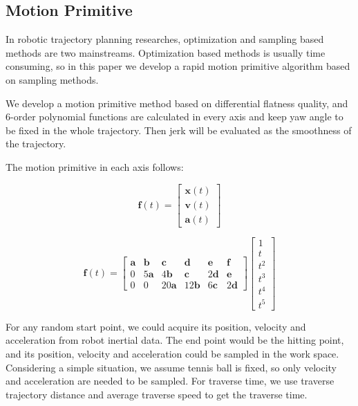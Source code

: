 \documentclass{jarticle}
\begin{document}
\subsection{Motion Primitive}
In robotic trajectory planning researches, optimization and sampling based methods are two mainstreams. Optimization based methods is usually time consuming, so in this paper we develop a rapid motion primitive algorithm based on sampling methods.

We develop a motion primitive method based on differential flatness quality, and 6-order polynomial functions are calculated in every axis and keep yaw angle to be fixed in the whole trajectory. Then jerk will be evaluated as the smoothness of the trajectory\cite{eth-juggling}.

The motion primitive in each axis follows:

\begin{equation}
  \label{eq:temp}
  \bm{f}(t) = \left[ \begin{array}{c}
      \bm{x}(t) \\
      \bm{v}(t) \\
      \bm{a}(t)
    \end{array}\right]
\end{equation}

\begin{equation}
  \label{eq:temp2}
  \bm{f}(t) = \begin{bmatrix}
      \bm{a} & \bm{b} & \bm{c} & \bm{d} & \bm{e} & \bm{f} \\
      0 & 5\bm{a} & 4\bm{b} & \bm{c} & 2\bm{d} & \bm{e} \\
      0 & 0 & 20\bm{a} & 12\bm{b} & 6\bm{c} & 2\bm{d}
  \end{bmatrix}
  \left[ \begin{array}{c}
      1 \\
      t \\
      t^2 \\
      t^3 \\
      t^4 \\
      t^5
    \end{array}\right]
\end{equation}


For any random start point, we could acquire its position, velocity and acceleration from robot inertial data. The end point would be the hitting point, and its position, velocity and acceleration could be sampled in the work space. Considering a simple situation, we assume tennis ball is fixed, so only velocity and acceleration are needed to be sampled. For traverse time, we use traverse trajectory distance and average traverse speed to get the traverse time.
\end{document}
